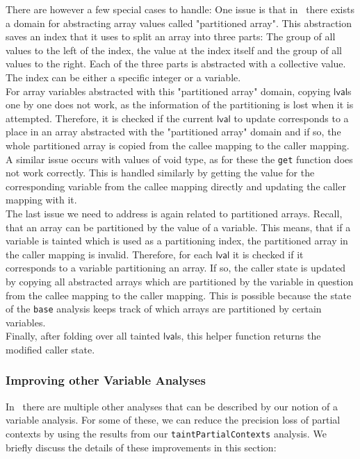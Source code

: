       There are however a few special cases to handle: One issue is that in \gob\ there exists a domain for abstracting array values called "partitioned array". This abstraction saves an index that it uses to split an array into three parts: The group of all values to the left of the index, the value at the index itself and the group of all values to the right. Each of the three parts is abstracted with a collective value. The index can be either a specific integer or a variable.\\
      For array variables abstracted with this "partitioned array" domain, copying $\textsf{lval}$s one by one does not work, as the information of the partitioning is lost when it is attempted. Therefore, it is checked if the current $\textsf{lval}$ to update corresponds to a place in an array abstracted with the "partitioned array" domain and if so, the whole partitioned array is copied from the callee mapping to the caller mapping.\\
      A similar issue occurs with values of void type, as for these the \texttt{get} function does not work correctly. This is handled similarly by getting the value for the corresponding variable from the callee mapping directly and updating the caller mapping with it.\\
      The last issue we need to address is again related to partitioned arrays. Recall, that an array can be partitioned by the value of a variable. This means, that if a variable is tainted which is used as a partitioning index, the partitioned array in the caller mapping is invalid. Therefore, for each $\textsf{lval}$ it is checked if it corresponds to a variable partitioning an array. If so, the caller state is updated by copying all abstracted arrays which are partitioned by the variable in question from the callee mapping to the caller mapping. This is possible because the state of the \texttt{base} analysis keeps track of which arrays are partitioned by certain variables.\\
      Finally, after folding over all tainted $\textsf{lval}$s, this helper function returns the modified caller state.

    \subsubsection{Improving other Variable Analyses}
      In \gob\ there are multiple other analyses that can be described by our notion of a variable analysis. For some of these, we can reduce the precision loss of partial contexts by using the results from our \texttt{taintPartialContexts} analysis. We briefly discuss the details of these improvements in this section:

